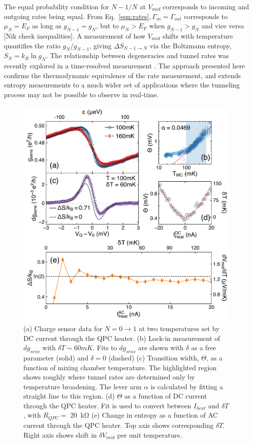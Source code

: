 \documentclass[twocolumn,showpacs,preprintnumbers,amsmath,amssymb,pra,aps,superscriptaddress]{revtex4-1}
\begin{document}
The equal probability condition for $N-1/N$ at $V_{mid}$ corresponds to  incoming and outgoing rates being equal.  From Eq.~\ref{eqn:rates}$, \Gamma_{in} = \Gamma_{out}$ corresponds to $\mu_{N} = E_F$ as long as $g_{N-1}=g_{N}$, but to $\mu_{N} > E_F$ when $g_{N-1} > g_{N}$ and vice versa [Nik check inequalities].   A measurement of how $V_{mid}$ shifts with temperature quantifies the ratio $g_{N}/g_{N-1}$, giving $\Delta S_{N-1\rightarrow N}$ via the Boltzmann entropy, $S_{N}=k_{B} \ln{g_N}$.  The relationship between degeneracies and tunnel rates was recently explored in a time-resolved measurement \cite{Hofmann2016}. The approach presented here confirms the thermodynamic equivalence of the rate measurement, and extends entropy measurements to a much wider set of applications where the tunneling process may not be possible to observe in real-time.


\begin{figure}[!]
        \includegraphics[width=1.0\columnwidth]{../figures/figure_2.pdf}
        \caption{\label{fig:fig2}(a) Charge sensor data for $N=0 \rightarrow 1$ at two temperatures set by DC current through the QPC heater. (b) Lock-in measurement of $dg_{sens}$ with $\delta T \sim 60mK$. Fits to $dg_{sens}$ are shown with $\delta$ as a free parameter (solid) and $\delta=0$ (dashed) (c) Transition width, $\Theta$, as a function of mixing chamber temperature. The highlighted region shows roughly where tunnel rates are determined only by temperature broadening. The lever arm $\alpha$ is calculated by fitting a straight line to this region. (d) $\Theta$ as a function of DC current through the QPC heater. Fit is used to convert between $I_{heat}$ and $\delta T$, with $R_{QPC} = $ \SI{20}{\kilo\ohm} (e) Change in entropy as a function of AC current through the QPC heater. Top axis shows corresponding $\delta T$. Right axis shows shift in $\delta V_{mid}$ per unit temperature.}
\end{figure}
\end{document}
